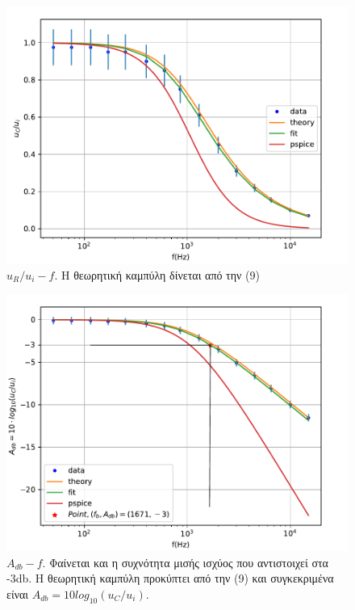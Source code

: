 \documentclass[a4paper]{article}
\begin{document}
		
		\begin{figure}[h!]
			\centering 
			\includegraphics[scale=0.7]{../plots/RC_f-Uc.pdf}
			\caption{$u_R/u_i - f$. Η θεωρητική καμπύλη δίνεται από την (9)}
			\label{fig11}
		\end{figure}
		
				\begin{figure}[h!]
			\centering 
			\includegraphics[scale=0.7]{../plots/RC_f-Adb.pdf}
			\caption{$A_{db} - f$. Φαίνεται και η συχνότητα μισής ισχύος που αντιστοιχεί στα -3db. Η θεωρητική καμπύλη προκύπτει από την (9) και συγκεκριμένα είναι $A_{db}=10log_{10}(u_C/u_i)$.}
			\label{fig12}
		\end{figure}
		
\end{document}
